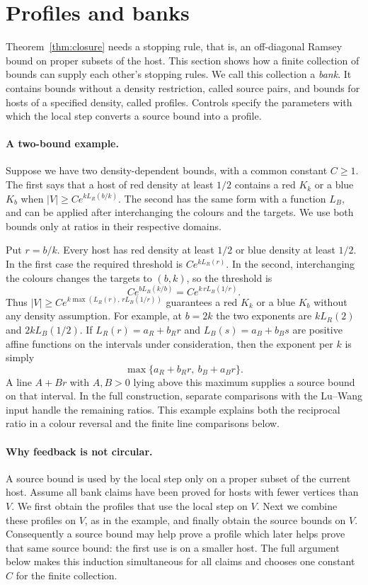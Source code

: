 \documentclass[11pt]{article}
\theoremstyle{definition}
\theoremstyle{remark}
\begin{document}
\section{Profiles and banks}\label{sec:banks}

Theorem~\ref{thm:closure} needs a stopping rule, that is, an off-diagonal Ramsey bound on proper subsets of the host.
This section shows how a finite collection of bounds can supply each other's stopping rules.
We call this collection a \emph{bank}. It contains bounds without a density restriction, called source pairs,
and bounds for hosts of a specified density, called profiles. Controls specify the parameters with which the
local step converts a source bound into a profile.

\paragraph{A two-bound example.}
Suppose we have two density-dependent bounds, with a common constant $C\ge1$.
The first says that a host of red density at least $1/2$ contains a red $K_k$ or a blue $K_b$ when
$|V|\ge Ce^{kL_R(b/k)}$. The second has the same form with a function $L_B$, and can be applied after
interchanging the colours and the targets. We use both bounds only at ratios in their respective domains.

Put $r=b/k$. Every host has red density at least $1/2$ or blue density at least $1/2$.
In the first case the required threshold is $Ce^{kL_R(r)}$.
In the second, interchanging the colours changes the targets to $(b,k)$, so the threshold is
\[
Ce^{bL_B(k/b)}=Ce^{k\,rL_B(1/r)}.
\]
Thus $|V|\ge Ce^{k\max(L_R(r),\,rL_B(1/r))}$ guarantees a red $K_k$ or a blue $K_b$ without any
density assumption. For example, at $b=2k$ the two exponents are $kL_R(2)$ and $2kL_B(1/2)$.
If $L_R(r)=a_R+b_Rr$ and $L_B(s)=a_B+b_Bs$ are positive affine functions on the intervals under consideration,
then the exponent per $k$ is simply
\[
\max\{a_R+b_Rr,\ b_B+a_Br\}.
\]
A line $A+Br$ with $A,B>0$ lying above this maximum supplies a source bound on that interval.
In the full construction, separate comparisons with the Lu--Wang input handle the remaining ratios.
This example explains both the reciprocal ratio in a colour reversal and the finite line comparisons below.

\paragraph{Why feedback is not circular.}
A source bound is used by the local step only on a proper subset of the current host.
Assume all bank claims have been proved for hosts with fewer vertices than $V$.
We first obtain the profiles that use the local step on $V$. Next we combine these profiles on $V$,
as in the example, and finally obtain the source bounds on $V$.
Consequently a source bound may help prove a profile which later helps prove that same source bound:
the first use is on a smaller host. The full argument below makes this induction simultaneous for all
claims and chooses one constant $C$ for the finite collection.
\end{document}

